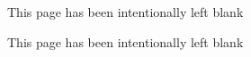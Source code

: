 \documentclass[11pt, a4paper, oneside]{Thesis} %
\begin{document}

\newpage
\thispagestyle{empty}
\vspace*{120pt}

\begin{center}
\Large
This page has been intentionally left blank
\end{center}

\clearpage


\pagestyle{fancy} %

\tableofcontents %

\listoffigures %

\listoftables %


\newpage
\thispagestyle{empty}
\vspace*{120pt}

\begin{center}
\Large
This page has been intentionally left blank
\end{center}

\clearpage


\mainmatter %

\pagestyle{fancy} %
\end{document}
